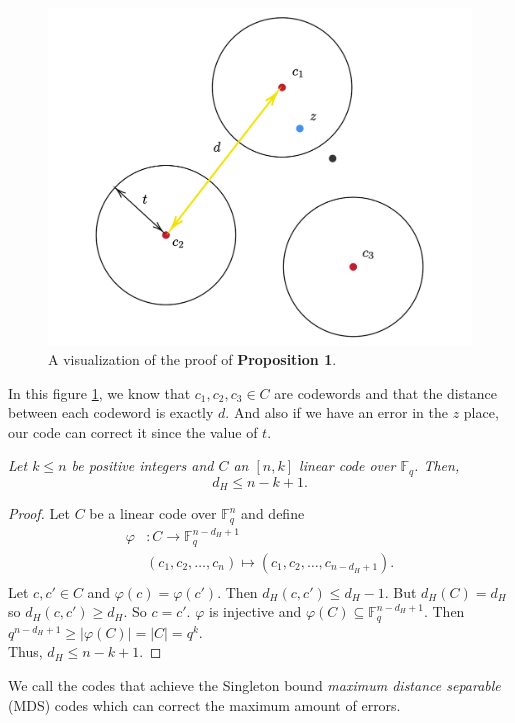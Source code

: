 \begin{figure}[h]
    \centering
    \includegraphics[scale=0.4]{balltheory.png}
    \caption{A visualization of the proof of \textbf{Proposition 1}.}
    \label{fig:ball}
\end{figure}
In this figure \ref{fig:ball}, we know that $c_1,c_2,c_3\in C$ are codewords and that the distance between each codeword is exactly $d$. And also if we have an error in the $z$ place, our code can correct it since the value of $t$.

\begin{theorem}
\textit{Let $k \leq n$ be positive integers and $C$ an $[n, k]$ linear code over $\mathbb{F}_q$. Then,}
\[
d_H \leq n - k + 1.
\]
\end{theorem}

\begin{proof}
    Let $C$ be a linear code over $\mathbb{F}_q^n$ and define\\
    \begin{align*}
    \varphi&: C \xrightarrow{}\mathbb{F}_q^{n-d_H+1}\\
    &(c_1, c_2, \dots,c_n) \mapsto (c_1,c_2,\dots,c_{n-d_H+1}).\\   
    \end{align*} 
    Let $c,c' \in C$ and $\varphi(c)=\varphi(c')$.
    Then $d_H(c, c') \leq d_H-1$.
    But $d_H(C)=d_H$ so $d_H(c, c') \geq d_H$. So $c = c'$. 
    $\varphi$ is injective and $\varphi(C) \subseteq \mathbb{F}_q^{n-d_H+1}$. Then $q^{n-d_H+1}\geq|\varphi(C)|=|C|=q^k$.\\
    Thus, $d_H\leq n-k+1 $.
\end{proof}
We call the codes that achieve the Singleton bound \textit{maximum distance separable} (MDS) codes which can correct the maximum amount of errors.

